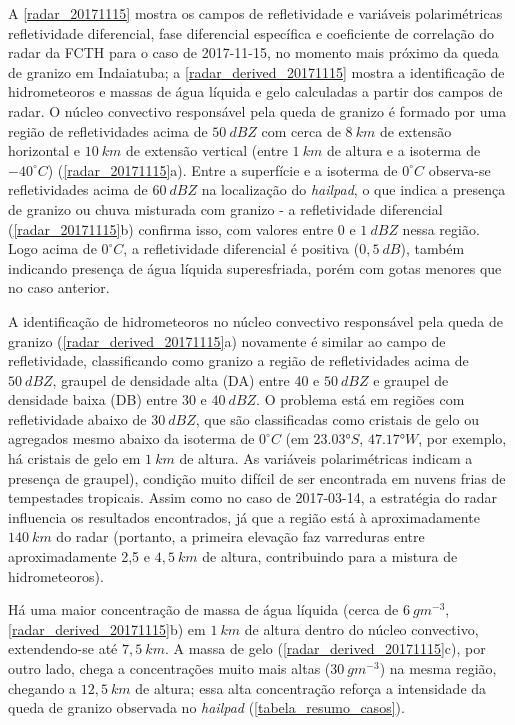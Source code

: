 A \autoref{radar_20171115} mostra os campos de refletividade e variáveis polarimétricas refletividade diferencial, fase diferencial específica e coeficiente de correlação do radar da FCTH para o caso de 2017-11-15, no momento mais próximo da queda de granizo em Indaiatuba; a \autoref{radar_derived_20171115} mostra a identificação de hidrometeoros e massas de água líquida e gelo calculadas a partir dos campos de radar. O núcleo convectivo responsável pela queda de granizo é formado por uma região de refletividades acima de $50\:dBZ$ com cerca de $8\:km$ de extensão horizontal e $10\:km$ de extensão vertical (entre $1\:km$ de altura e a isoterma de $-40^{\circ}C$) (\autoref{radar_20171115}a). Entre a superfície e a isoterma de $0^{\circ}C$ observa-se refletividades acima de $60\:dBZ$ na localização do \textit{hailpad}, o que indica a presença de granizo ou chuva misturada com granizo - a refletividade diferencial (\autoref{radar_20171115}b) confirma isso, com valores entre 0 e $1\:dBZ$ nessa região. Logo acima de $0^{\circ}C$, a refletividade diferencial é positiva ($0,5\:dB$), também indicando presença de água líquida superesfriada, porém com gotas menores que no caso anterior.

A identificação de hidrometeoros no núcleo convectivo responsável pela queda de granizo (\autoref{radar_derived_20171115}a) novamente é similar ao campo de refletividade, classificando como granizo a região de refletividades acima de $50\:dBZ$, graupel de densidade alta (DA) entre 40 e $50\:dBZ$ e graupel de densidade baixa (DB) entre 30 e $40\:dBZ$. O problema está em regiões com refletividade abaixo de $30\:dBZ$, que são classificadas como cristais de gelo ou agregados mesmo abaixo da isoterma de $0^{\circ}C$ (em $\ang{23.03}S$, $\ang{47.17}W$, por exemplo, há cristais de gelo em $1\:km$ de altura. As variáveis polarimétricas indicam a presença de graupel), condição muito difícil de ser encontrada em nuvens frias de tempestades tropicais. Assim como no caso de 2017-03-14, a estratégia do radar influencia os resultados encontrados, já que a região está à aproximadamente $140\:km$ do radar (portanto, a primeira elevação faz varreduras entre aproximadamente 2,5 e $4,5\:km$ de altura, contribuindo para a mistura de hidrometeoros).

Há uma maior concentração de massa de água líquida (cerca de $6\:gm^{-3}$, \autoref{radar_derived_20171115}b) em $1\:km$ de altura dentro do núcleo convectivo, extendendo-se até $7,5\:km$. A massa de gelo (\autoref{radar_derived_20171115}c), por outro lado, chega a concentrações muito mais altas ($30\:gm^{-3}$) na mesma região, chegando a $12,5\:km$ de altura; essa alta concentração reforça a intensidade da queda de granizo observada no \textit{hailpad} (\autoref{tabela_resumo_casos}).

